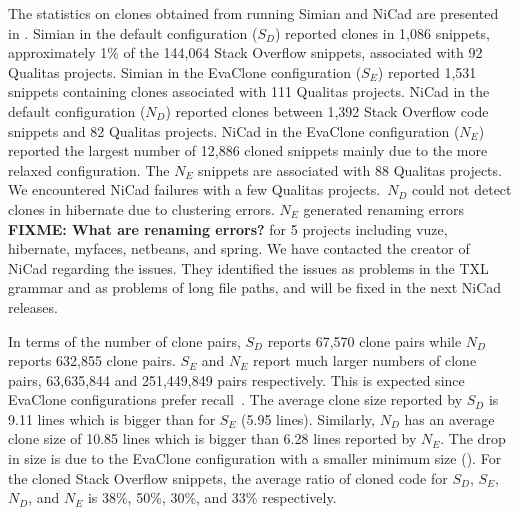 \documentclass[sigconf,review, anonymous]{acmart}
\newcommand\FIXME[1]{\textbf{FIXME: #1}}
\begin{document}
The statistics on clones obtained from running Simian and NiCad are
presented in . Simian in the default configuration
($S_D$) reported clones in 1,086 snippets, approximately 1\% of the
144,064 Stack Overflow snippets, associated with 92 Qualitas
projects. Simian in the EvaClone configuration ($S_E$) reported 1,531
snippets containing clones associated with 111 Qualitas
projects. NiCad in the default configuration ($N_D$) reported clones
between 1,392 Stack Overflow code snippets and 82 Qualitas
projects. NiCad in the EvaClone configuration ($N_E$) reported the
largest number of 12,886 cloned snippets mainly due to the more
relaxed configuration. The $N_E$ snippets are associated with 88
Qualitas projects. We encountered NiCad failures with a few Qualitas
projects.~$N_D$ could not detect clones in \textsf{hibernate} due to
clustering errors. $N_E$ generated renaming errors \FIXME{What are
  renaming errors?}  for 5 projects including \textsf{vuze},
\textsf{hibernate}, \textsf{myfaces}, \textsf{netbeans}, and
\textsf{spring}. We have contacted the creator of NiCad regarding the
issues. They identified the issues as problems in the TXL grammar and
as problems of long file paths, and will be fixed in the next NiCad
releases. 


In terms of the number of clone pairs, $S_D$ reports 67,570 clone
pairs while $N_D$ reports 632,855 clone pairs. $S_E$ and $N_E$ report
much larger numbers of clone pairs, 63,635,844 and 251,449,849 pairs
respectively. This is expected since EvaClone configurations prefer
recall~\cite{Wang2013}.
The average clone size reported by $S_D$ is 9.11 lines which is bigger
than for $S_E$ (5.95 lines). Similarly, $N_D$ has an average clone
size of 10.85 lines which is bigger than 6.28 lines reported by
$N_E$. The drop in size is due to the EvaClone configuration with a
smaller minimum size (). For the cloned Stack
Overflow snippets, the average ratio of cloned code for $S_D$, $S_E$,
$N_D$, and $N_E$ is 38\%, 50\%, 30\%, and 33\% respectively.
\end{document}
